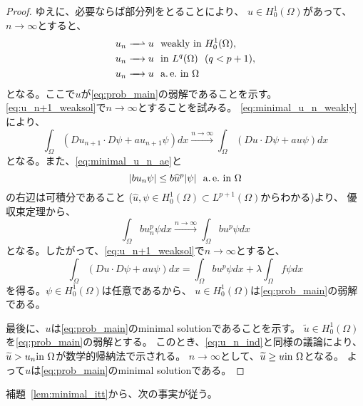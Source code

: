 \begin{proof}
 ゆえに、必要ならば部分列をとることにより、
 $u \in H_0^1(\Omega)$があって、$n \to \infty$とすると、
 \begin{align}
  u_n \xrightharpoonup{ \mbox{ ~ } } u & \ \ \text{weakly~} \tin
  H_0^1(\Omega), \label{eq:minimal_u_n_weakly} \\
  u_n \xrightarrow{ \mbox{ ~ } } u & \ \ \tin L^q(\Omega) \notag \ \
   (q < p+1), \\
  u_n \xrightarrow{ \mbox{ ~ } } u & \ \ \ae \tin \Omega 
    \label{eq:minimal_u_n_ae}
 \end{align}
 となる。ここで$u$が\ref{eq:prob_main}の弱解であることを示す。
 \eqref{eq:u_n+1_weaksol}で$n \to \infty$とすることを試みる。
 \eqref{eq:minimal_u_n_weakly}により、
 \[
 \int_\Omega (Du_{n+1} \cdot D\psi + a u_{n+1} \psi) dx
 \xrightarrow{n \to \infty}
 \int_\Omega (Du \cdot D\psi + a u \psi) dx
 \]
 となる。また、\eqref{eq:minimal_u_n_ae}と
 \[
  \left\lvert bu_n \psi \right\rvert \leq b \widehat{u}^p \lvert\psi\rvert \ \ \text{a.\,e.}~
 \text{in}~ \Omega
 \]
 の右辺は可積分であること
 ($\hat{u}, \psi \in H_0^1(\Omega) \subset L^{p+1}(\Omega)$からわかる)より、
 優収束定理から、
 \[
 \int_\Omega bu_n^p \psi dx \xrightarrow{n \to \infty} 
 \int_\Omega bu^p \psi dx
 \]
 となる。したがって、\eqref{eq:u_n+1_weaksol}で$n \to \infty$とすると、
 \begin{equation}
  \int_\Omega (Du \cdot D\psi + a u \psi) dx 
   = \int_\Omega bu^p \psi dx + \lambda \int_\Omega f\psi dx
   \label{eq:minimal_u_weaksol}
 \end{equation}
 を得る。$\psi \in H_0^1(\Omega)$は任意であるから、
 $u \in H_0^1(\Omega)$は\ref{eq:prob_main}の弱解である。
 
 最後に、$u$は\ref{eq:prob_main}のminimal solutionであることを示す。
 $\tilde{u} \in H_0^1(\Omega)$を\ref{eq:prob_main}の弱解とする。
 このとき、\eqref{eq:u_n_ind}と同様の議論により、
 $\widetilde{u} > u_n \text{in}~ \Omega$が数学的帰納法で示される。
 $n \to \infty$として、$\widetilde{u} \geq u \text{in}~ \Omega$となる。
 よって$u$は\ref{eq:prob_main}のminimal solutionである。\qedhere
\end{proof}

補題~\ref{lem:minimal_itt}から、次の事実が従う。

